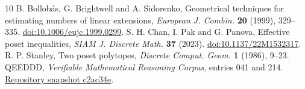 \documentclass[11pt,a4paper]{article}
\numberwithin{equation}{section}
\begin{document}
\begin{thebibliography}{10}
 B. Bollob\'as, G. Brightwell and A. Sidorenko, Geometrical techniques for estimating numbers of linear extensions, \emph{European J. Combin.} \textbf{20} (1999), 329--335. \href{https://doi.org/10.1006/eujc.1999.0299}{doi:10.1006/eujc.1999.0299}.
 S. H. Chan, I. Pak and G. Panova, Effective poset inequalities, \emph{SIAM J. Discrete Math.} \textbf{37} (2023). \href{https://doi.org/10.1137/22M1532317}{doi:10.1137/22M1532317}.
 R. P. Stanley, Two poset polytopes, \emph{Discrete Comput. Geom.} \textbf{1} (1986), 9--23.
 QEEDDD, \emph{Verifiable Mathematical Reasoning Corpus}, entries 041 and 214. \href{https://github.com/QEEDDD/Verifiable-Mathematical-Reasoning-Corpus/tree/c2ac34ea4622778187173f41bb1996deee8081b7}{Repository snapshot c2ac34e}.
\end{thebibliography}
\end{document}
